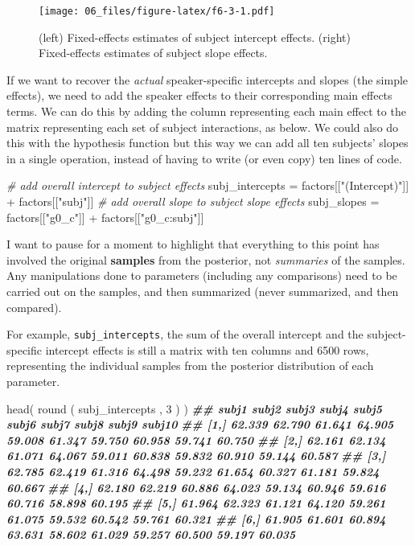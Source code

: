 \documentclass[
]{book}
\newenvironment{Shaded}{\begin{snugshade}}{\end{snugshade}}
\newcommand{\CommentTok}[1]{\textcolor[rgb]{0.56,0.35,0.01}{\textit{#1}}}
\newcommand{\DecValTok}[1]{\textcolor[rgb]{0.00,0.00,0.81}{#1}}
\newcommand{\DocumentationTok}[1]{\textcolor[rgb]{0.56,0.35,0.01}{\textbf{\textit{#1}}}}
\newcommand{\FunctionTok}[1]{\textcolor[rgb]{0.00,0.00,0.00}{#1}}
\newcommand{\NormalTok}[1]{#1}
\newcommand{\OtherTok}[1]{\textcolor[rgb]{0.56,0.35,0.01}{#1}}
\newcommand{\SpecialCharTok}[1]{\textcolor[rgb]{0.00,0.00,0.00}{#1}}
\newcommand{\StringTok}[1]{\textcolor[rgb]{0.31,0.60,0.02}{#1}}
\begin{document}
\begin{figure}
\centering
\texttt{[image: 06\_files/figure-latex/f6-3-1.pdf]}
\caption{\label{fig:f6-3}(left) Fixed-effects estimates of subject intercept effects. (right) Fixed-effects estimates of subject slope effects.}
\end{figure}

If we want to recover the \emph{actual} speaker-specific intercepts and slopes (the simple effects), we need to add the speaker effects to their corresponding main effects terms. We can do this by adding the column representing each main effect to the matrix representing each set of subject interactions, as below. We could also do this with the hypothesis function but this way we can add all ten subjects' slopes in a single operation, instead of having to write (or even copy) ten lines of code.

\begin{Shaded}
\begin{Highlighting}[]
\CommentTok{\# add overall intercept to subject effects}
\NormalTok{subj\_intercepts }\OtherTok{=}\NormalTok{ factors[[}\StringTok{"(Intercept)"}\NormalTok{]] }\SpecialCharTok{+}\NormalTok{ factors[[}\StringTok{"subj"}\NormalTok{]]}
\CommentTok{\# add overall slope to subject slope effects}
\NormalTok{subj\_slopes }\OtherTok{=}\NormalTok{ factors[[}\StringTok{"g0\_c"}\NormalTok{]] }\SpecialCharTok{+}\NormalTok{ factors[[}\StringTok{"g0\_c:subj"}\NormalTok{]]}
\end{Highlighting}
\end{Shaded}

I want to pause for a moment to highlight that everything to this point has involved the original \textbf{samples} from the posterior, not \emph{summaries} of the samples. Any manipulations done to parameters (including any comparisons) need to be carried out on the samples, and then summarized (never summarized, and then compared).

For example, \texttt{subj\_intercepts}, the sum of the overall intercept and the subject-specific intercept effects is still a matrix with ten columns and 6500 rows, representing the individual samples from the posterior distribution of each parameter.

\begin{Shaded}
\begin{Highlighting}[]
\FunctionTok{head}\NormalTok{( }\FunctionTok{round}\NormalTok{ ( subj\_intercepts , }\DecValTok{3}\NormalTok{ ) )}
\DocumentationTok{\#\#       subj1  subj2  subj3  subj4  subj5  subj6  subj7  subj8  subj9 subj10}
\DocumentationTok{\#\# [1,] 62.339 62.790 61.641 64.905 59.008 61.347 59.750 60.958 59.741 60.750}
\DocumentationTok{\#\# [2,] 62.161 62.134 61.071 64.067 59.011 60.838 59.832 60.910 59.144 60.587}
\DocumentationTok{\#\# [3,] 62.785 62.419 61.316 64.498 59.232 61.654 60.327 61.181 59.824 60.667}
\DocumentationTok{\#\# [4,] 62.180 62.219 60.886 64.023 59.134 60.946 59.616 60.716 58.898 60.195}
\DocumentationTok{\#\# [5,] 61.964 62.323 61.121 64.120 59.261 61.075 59.532 60.542 59.761 60.321}
\DocumentationTok{\#\# [6,] 61.905 61.601 60.894 63.631 58.602 61.029 59.257 60.500 59.197 60.035}
\end{Highlighting}
\end{Shaded}
\end{document}
